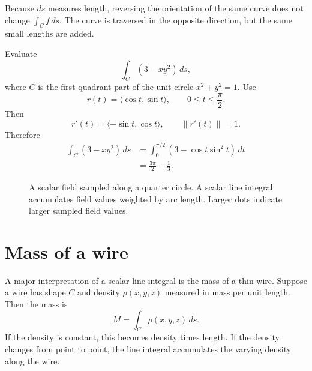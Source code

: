 \documentclass[11pt,oneside]{book}
\newcommand{\norm}[1]{\left\lVert #1\right\rVert}
\begin{document}
\begin{definitionbox}
Because $ds$ measures length, reversing the orientation of the same curve does not change $\int_C f\,ds$. The curve is traversed in the opposite direction, but the same small lengths are added.
\end{definitionbox}

\begin{examplebox}
Evaluate
\[
\int_C (3-xy^2)\,ds,
\]
where $C$ is the first-quadrant part of the unit circle $x^2+y^2=1$.
Use
\[
r(t)=\langle \cos t,\sin t\rangle,\qquad 0\le t\le \frac{\pi}{2}.
\]
Then
\[
r'(t)=\langle -\sin t,\cos t\rangle,\qquad \norm{r'(t)}=1.
\]
Therefore
\[
\begin{aligned}
\int_C (3-xy^2)\,ds
&=\int_0^{\pi/2}\left(3-\cos t\sin^2t\right)\,dt\\
&=\frac{3\pi}{2}-\frac13.
\end{aligned}
\]
\end{examplebox}

\begin{figure}[H]
\centering
{}
\caption{A scalar field sampled along a quarter circle. A scalar line integral accumulates field values weighted by arc length. Larger dots indicate larger sampled field values.}
\end{figure}

\section{Mass of a wire}

A major interpretation of a scalar line integral is the mass of a thin wire. Suppose a wire has shape $C$ and density $\rho(x,y,z)$ measured in mass per unit length. Then the mass is
\[
M=\int_C \rho(x,y,z)\,ds.
\]
If the density is constant, this becomes density times length. If the density changes from point to point, the line integral accumulates the varying density along the wire.
\end{document}
